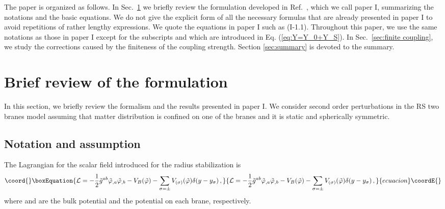 \documentclass[a4paper,showpacs,preprintnumbers,amsmath,amssymb]{revtex4}
\begin{document}
The paper is organized as follows. In Sec.~\ref{sec:review} we briefly review the formulation developed in Ref.~\cite{Kudoh:2001kz}, which we call paper I, summarizing the notations and the basic equations.  
We do not give the explicit form of all the necessary formulas that are already presented in paper I to avoid repetitions of rather lengthy expressions. 
We quote the equations in paper I such as (I-1.1).  
Throughout this paper, we use the same notations as those in paper I except for the subscripts \coordHE{} and \coordHE{} which are introduced in Eq. (\ref{eq:Y=Y_0+Y_S}).  
In Sec.~\ref{sec:finite coupling}, we study the corrections caused by the finiteness of the coupling strength.  
Section \ref{sec:summary} is devoted to the summary. 





\section{Brief review of the formulation}
\label{sec:review}


In this section, we briefly review the formalism and the results presented in paper I.  
We consider second order perturbations in the RS two branes model assuming that matter distribution is confined on one of the branes and it is static and spherically symmetric.   


\subsection{Notation and assumption}

The Lagrangian for the scalar field \myHighlight{$\tilde\varphi$}\coordHE{} introduced for the radius stabilization is  
\begin{equation}\coord{}\boxEquation{
 {\cal L}= - \frac{1}{2} \tilde  g^{ab} 
     \tilde\varphi_{,a} \tilde\varphi_{,b}
          -V_B(\tilde\varphi)
          -\sum_{\sigma=\pm} V_{(\sigma)}(\tilde\varphi)
              \delta(y-y_{\sigma}) \,,
\label{eq:Lagrangian}
}{
 {\cal L}= - \frac{1}{2} \tilde  g^{ab} 
     \tilde\varphi_{,a} \tilde\varphi_{,b}
          -V_B(\tilde\varphi)
          -\sum_{\sigma=\pm} V_{(\sigma)}(\tilde\varphi)
              \delta(y-y_{\sigma}) \,,
}{ecuacion}\coordE{}\end{equation}
where \coordHE{} and \coordHE{} are the bulk potential and the potential on each brane, respectively.  
\end{document}
